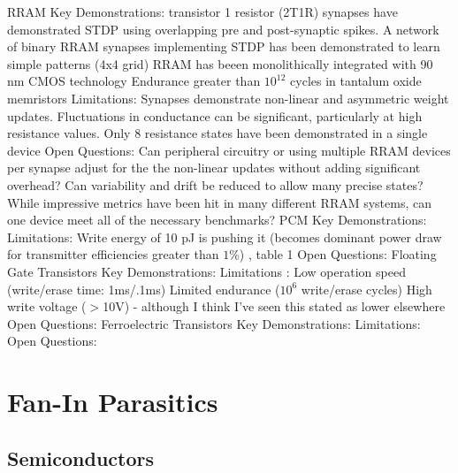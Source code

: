 \documentclass[twocolumn]{article}
\begin{document}
\begin{outline}
    \1 RRAM \cite{ielmini2018brain}
        \2 Key Demonstrations: 
             transistor 1 resistor (2T1R) synapses have demonstrated STDP using overlapping pre and post-synaptic spikes.
            \3 A network of binary RRAM synapses implementing STDP has been demonstrated to learn simple patterns (4x4 grid)
            \3 RRAM has beeen monolithically integrated with 90 nm CMOS technology \cite{yin2019monolithically}
            \3 Endurance greater than $10^{12}$ cycles in tantalum oxide memristors \cite{zahoor2020resistive}
        \2 Limitations: 
            \3 Synapses demonstrate non-linear and asymmetric weight updates.
            \3 Fluctuations in conductance can be significant, particularly at high resistance values. 
            \3 Only 8 resistance states have been demonstrated in a single device \cite{zahoor2020resistive}
        \2 Open Questions:  
            \3 Can peripheral circuitry or using multiple RRAM devices per synapse adjust for the the non-linear updates without adding significant overhead?
            \3 Can variability and drift be reduced to allow many precise states?
            \3 While impressive metrics have been hit in many different RRAM systems, can one device meet all of the necessary benchmarks?
    \1 PCM
        \2 Key Demonstrations:
        \2 Limitations:
            \3 Write energy of 10 pJ is pushing it (becomes dominant power draw for transmitter efficiencies greater than $1\%$) \cite{zahoor2020resistive}, table 1
        \2 Open Questions:
    \1 Floating Gate Transistors
        \2 Key Demonstrations:
        \2 Limitations \cite{zahoor2020resistive}:
            \3 Low operation speed (write/erase time: 1ms/.1ms)
            \3 Limited endurance ($10^6$ write/erase cycles)
            \3 High write voltage ($>$10V) - although I think I've seen this stated as lower elsewhere 
        \2 Open Questions:
    \1 Ferroelectric Transistors
        \2 Key Demonstrations:
        \2 Limitations:
        \2 Open Questions:
    
\end{outline}

\appendix

\section{\label{apx:fan-in}Fan-In Parasitics}
\subsection{Semiconductors}
\end{document}
